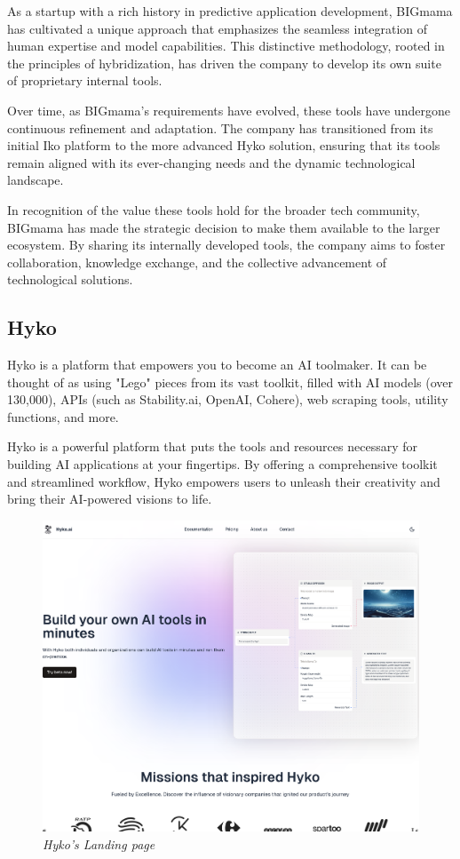 As a startup with a rich history in predictive application development, BIGmama has cultivated a unique approach that emphasizes the seamless integration of human expertise and model capabilities. This distinctive methodology, rooted in the principles of hybridization, has driven the company to develop its own suite of proprietary internal tools.

Over time, as BIGmama's requirements have evolved, these tools have undergone continuous refinement and adaptation. The company has transitioned from its initial Iko platform to the more advanced Hyko solution, ensuring that its tools remain aligned with its ever-changing needs and the dynamic technological landscape.

In recognition of the value these tools hold for the broader tech community, BIGmama has made the strategic decision to make them available to the larger ecosystem. By sharing its internally developed tools, the company aims to foster collaboration, knowledge exchange, and the collective advancement of technological solutions.


\subsection{Hyko}

Hyko is a platform that empowers you to become an AI toolmaker. It can be thought of as using "Lego" pieces from its vast toolkit, filled with AI models (over 130,000), APIs (such as Stability.ai, OpenAI, Cohere), web scraping tools, utility functions, and more.

Hyko is a powerful platform that puts the tools and resources necessary for building AI applications at your fingertips. By offering a comprehensive toolkit and streamlined workflow, Hyko empowers users to unleash their creativity and bring their AI-powered visions to life.

\begin{figure}[!ht]
    \centering
    \includegraphics[width=\linewidth]{hyko.png}
    \caption{\it{Hyko's Landing page}}
    \label{fig:hyko_landing_page}
\end{figure}

